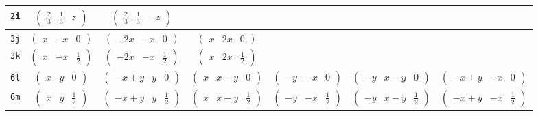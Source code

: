 \documentclass[fleqn,9pt,landscape]{jsarticle}
\begin{document}
\begin{center}
\begin{longtable}{ccccccc}
{\tt 2i} & $ \begin{pmatrix} \frac{2}{3} & \frac{1}{3} & z \end{pmatrix} $ & $ \begin{pmatrix} \frac{2}{3} & \frac{1}{3} & - z \end{pmatrix} $ & $  $ & $  $ & $  $ & $  $ \\ \hline
{\tt 3j} & $ \begin{pmatrix} x & - x & 0 \end{pmatrix} $ & $ \begin{pmatrix} - 2 x & - x & 0 \end{pmatrix} $ & $ \begin{pmatrix} x & 2 x & 0 \end{pmatrix} $ & $  $ & $  $ & $  $ \\ \hline
{\tt 3k} & $ \begin{pmatrix} x & - x & \frac{1}{2} \end{pmatrix} $ & $ \begin{pmatrix} - 2 x & - x & \frac{1}{2} \end{pmatrix} $ & $ \begin{pmatrix} x & 2 x & \frac{1}{2} \end{pmatrix} $ & $  $ & $  $ & $  $ \\ \hline
{\tt 6l} & $ \begin{pmatrix} x & y & 0 \end{pmatrix} $ & $ \begin{pmatrix} - x + y & y & 0 \end{pmatrix} $ & $ \begin{pmatrix} x & x - y & 0 \end{pmatrix} $ & $ \begin{pmatrix} - y & - x & 0 \end{pmatrix} $ & $ \begin{pmatrix} - y & x - y & 0 \end{pmatrix} $ & $ \begin{pmatrix} - x + y & - x & 0 \end{pmatrix} $ \\ \hline
{\tt 6m} & $ \begin{pmatrix} x & y & \frac{1}{2} \end{pmatrix} $ & $ \begin{pmatrix} - x + y & y & \frac{1}{2} \end{pmatrix} $ & $ \begin{pmatrix} x & x - y & \frac{1}{2} \end{pmatrix} $ & $ \begin{pmatrix} - y & - x & \frac{1}{2} \end{pmatrix} $ & $ \begin{pmatrix} - y & x - y & \frac{1}{2} \end{pmatrix} $ & $ \begin{pmatrix} - x + y & - x & \frac{1}{2} \end{pmatrix} $ \\ \hline

\end{longtable}
\end{center}
\end{document}
